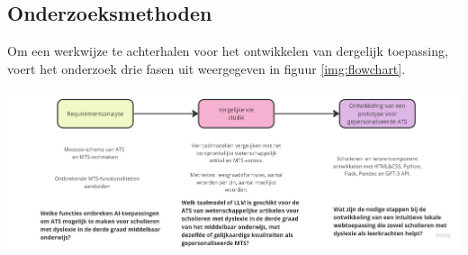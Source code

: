 \documentclass[a0,portrait]{hogent-poster}
\begin{document}
\begin{multicols}{2}
\section{Onderzoeksmethoden}

Om een werkwijze te achterhalen voor het ontwikkelen van dergelijk toepassing, voert het onderzoek drie fasen uit weergegeven in figuur \ref{img:flowchart}.

\begin{center}
	\captionsetup{type=figure}
	\includegraphics[width=1.0\linewidth]{figures/onderzoeksmethoden.jpg}
	\label{img:flowchart}
\end{center}





\end{multicols}
\end{document}
